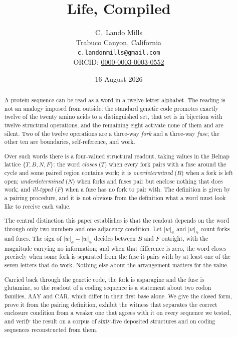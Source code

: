 \documentclass[12pt,a4paper]{article}
\begin{document}
\title{\textbf{Life, Compiled}}
\author{C.\ Lando Mills\\
Trabuco Canyon, California\\
\texttt{c.landonmills@gmail.com}\\
ORCID: \href{https://orcid.org/0000-0003-0003-0552}{0000-0003-0003-0552}}
\date{16 August 2026}
\maketitle

\begin{abstract}
A protein sequence can be read as a word in a twelve-letter alphabet. The reading
is not an analogy imposed from outside: the standard genetic code promotes exactly
twelve of the twenty amino acids to a distinguished set, that set is in bijection
with twelve structural operations, and the remaining eight activate none of them
and are silent. Two of the twelve operations are a three-way \emph{fork} and a
three-way \emph{fuse}; the other ten are boundaries, self-reference, and work.

Over such words there is a four-valued structural readout, taking values in the
Belnap lattice $\{T, B, N, F\}$: the word \emph{closes} ($T$) when every fork pairs
with a fuse around the cycle and some paired region contains work; it is
\emph{overdetermined} ($B$) when a fork is left open; \emph{underdetermined} ($N$)
when forks and fuses pair but enclose nothing that does work; and \emph{ill-typed}
($F$) when a fuse has no fork to pair with. The definition is given by a pairing
procedure, and it is not obvious from the definition what a word must look like to
receive each value.

The central distinction this paper establishes is that the readout depends on the
word through only two numbers and one adjacency condition. Let $|w|_{\in}$ and
$|w|_{\ni}$ count forks and fuses. The sign of $|w|_{\in} - |w|_{\ni}$ decides
between $B$ and $F$ outright, with the magnitude carrying no information; and when
that difference is zero, the word closes precisely when some fork is separated from
the fuse it pairs with by at least one of the seven letters that do work. Nothing
else about the arrangement matters for the value.

Carried back through the genetic code, the fork is asparagine and the fuse is
glutamine, so the readout of a coding sequence is a statement about two codon
families, $\mathrm{AAY}$ and $\mathrm{CAR}$, which differ in their first base
alone. We give the closed form, prove it from the pairing definition, exhibit the
witness that separates the correct enclosure condition from a weaker one that
agrees with it on every sequence we tested, and verify the result on a corpus of
sixty-five deposited structures and on coding sequences reconstructed from them.
\end{abstract}
\end{document}
